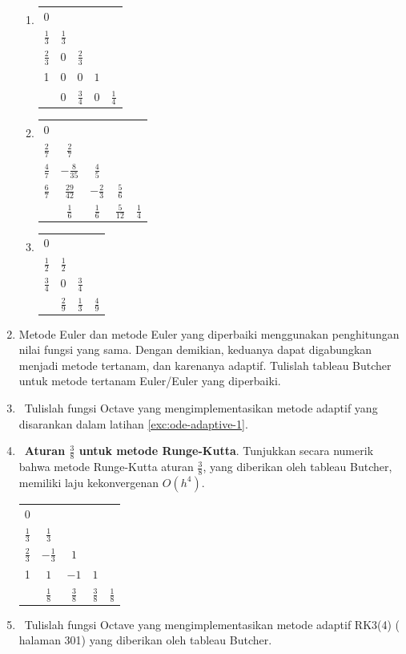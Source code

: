 \begin{enumerate}
\begin{enumerate}
\item \label{exc:ode-adaptive-8}%
\begin{tabular}{c|cccc}
0 &  &  &  & \tabularnewline
$\frac{1}{3}$ & $\frac{1}{3}$ &  &  & \tabularnewline
$\frac{2}{3}$ & $0$ & $\frac{2}{3}$ &  & \tabularnewline
1 & $0$ & $0$ & $1$ & \tabularnewline
\hline 
 & $0$ & $\frac{3}{4}$ & $0$ & $\frac{1}{4}$\tabularnewline
\end{tabular}
\item \label{exc:ode-adaptive-9}%
\begin{tabular}{c|cccc}
0 &  &  &  & \tabularnewline
$\frac{2}{7}$ & $\frac{2}{7}$ &  &  & \tabularnewline
$\frac{4}{7}$ & $-\frac{8}{35}$ & $\frac{4}{5}$ &  & \tabularnewline
$\frac{6}{7}$ & $\frac{29}{42}$ & $-\frac{2}{3}$ & $\frac{5}{6}$ & \tabularnewline
\hline 
 & $\frac{1}{6}$ & $\frac{1}{6}$ & $\frac{5}{12}$ & $\frac{1}{4}$\tabularnewline
\end{tabular} \hasasolution 
\item \label{exc:ode-adaptive-10}%
\begin{tabular}{c|ccc}
$0$ &  &  & \tabularnewline
$\frac{1}{2}$ & $\frac{1}{2}$ &  & \tabularnewline
$\frac{3}{4}$ & $0$ & $\frac{3}{4}$ & \tabularnewline
\hline 
 & $\frac{2}{9}$ & $\frac{1}{3}$ & $\frac{4}{9}$\tabularnewline
\end{tabular}
\end{enumerate}
\item \label{exc:ode-adaptive-1}Metode Euler dan metode Euler yang diperbaiki
menggunakan penghitungan nilai fungsi yang sama. Dengan demikian,
keduanya dapat digabungkan menjadi metode tertanam, dan karenanya
adaptif. Tulislah tableau Butcher untuk metode tertanam Euler/Euler
yang diperbaiki.
\item \octave\ \label{exc:ode-adaptive-2}Tulislah fungsi Octave yang mengimplementasikan
metode adaptif yang disarankan dalam latihan \ref{exc:ode-adaptive-1}.
\item \octave\ \label{exc:ode-adaptive-11}\textbf{Aturan $\frac{3}{8}$
untuk metode Runge-Kutta}. Tunjukkan secara numerik bahwa metode Runge-Kutta
aturan $\frac{3}{8}$, yang diberikan oleh tableau Butcher, memiliki
laju kekonvergenan $O(h^{4})$.

\begin{center}
\begin{tabular}{c|cccc}
0 &  &  &  & \tabularnewline
$\frac{1}{3}$ & $\frac{1}{3}$ &  &  & \tabularnewline
$\frac{2}{3}$ & $-\frac{1}{3}$ & $1$ &  & \tabularnewline
1 & $1$ & $-1$ & $1$ & \tabularnewline
\hline 
 & $\frac{1}{8}$ & $\frac{3}{8}$ & $\frac{3}{8}$ & $\frac{1}{8}$\tabularnewline
\end{tabular}
\par\end{center}
\item \octave\ \label{exc:ode-adaptive-12}Tulislah fungsi Octave yang
mengimplementasikan metode adaptif RK3(4) (\cite{butcherbook} halaman
301) yang diberikan oleh tableau Butcher. \hasasolution 


\end{enumerate}
